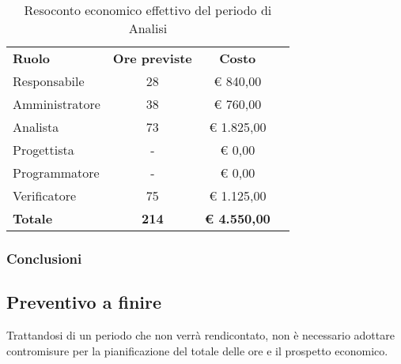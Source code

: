 \documentclass[../piano-di-progetto.tex]{subfiles}
\begin{document}
  \begin{table}[H]
    \centering
    \begin{tabular}{lccc}
      \rowcolor{lightgray}
      \textbf{Ruolo}  & \textbf{Ore previste} & \textbf{Costo}  \\
        Responsabile    & 28           & € 840,00            \\
        Amministratore  & 38           & € 760,00            \\
        Analista        & 73           & € 1.825,00          \\
        Progettista     & -            & € 0,00              \\
        Programmatore   & -            & € 0,00              \\
        Verificatore    & 75           & € 1.125,00          \\
        \textbf{Totale} & \textbf{214} & \textbf{€ 4.550,00}
    \end{tabular}
    \caption{Resoconto economico effettivo del periodo di Analisi}
  \end{table}


\subsubsection{Conclusioni}

\subsection{Preventivo a finire}
Trattandosi di un periodo che non verrà rendicontato, non è necessario adottare contromisure per la pianificazione del totale delle ore e il prospetto economico.
\end{document}
